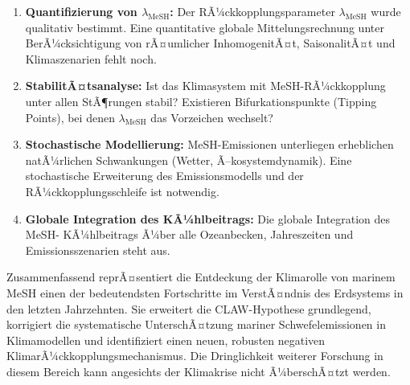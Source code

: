 ﻿\documentclass[a4paper,12pt]{article}
\theoremstyle{definition}
\begin{document}
\begin{enumerate}
  \item \textbf{Quantifizierung von $\lambda_{\mathrm{MeSH}}$:} Der RÃ¼ckkopplungsparameter
        $\lambda_{\mathrm{MeSH}}$ wurde qualitativ bestimmt. Eine quantitative globale
        Mittelungsrechnung unter BerÃ¼cksichtigung von rÃ¤umlicher InhomogenitÃ¤t,
        SaisonalitÃ¤t und Klimaszenarien fehlt noch.
  \item \textbf{StabilitÃ¤tsanalyse:} Ist das Klimasystem mit MeSH-RÃ¼ckkopplung unter allen
        StÃ¶rungen stabil? Existieren Bifurkationspunkte (Tipping Points), bei denen
        $\lambda_{\mathrm{MeSH}}$ das Vorzeichen wechselt?
  \item \textbf{Stochastische Modellierung:} MeSH-Emissionen unterliegen erheblichen natÃ¼rlichen
        Schwankungen (Wetter, Ã–kosystemdynamik). Eine stochastische Erweiterung des
        Emissionsmodells und der RÃ¼ckkopplungsschleife ist notwendig.
  \item \textbf{Globale Integration des KÃ¼hlbeitrags:} Die globale Integration des MeSH-
        KÃ¼hlbeitrags Ã¼ber alle Ozeanbecken, Jahreszeiten und Emissionsszenarien steht aus.
\end{enumerate}

Zusammenfassend reprÃ¤sentiert die Entdeckung der Klimarolle von marinem MeSH einen der
bedeutendsten Fortschritte im VerstÃ¤ndnis des Erdsystems in den letzten Jahrzehnten. Sie
erweitert die CLAW-Hypothese \cite{charlson1987} grundlegend, korrigiert die systematische
UnterschÃ¤tzung mariner Schwefelemissionen in Klimamodellen und identifiziert einen neuen,
robusten negativen KlimarÃ¼ckkopplungsmechanismus. Die Dringlichkeit weiterer Forschung in
diesem Bereich kann angesichts der Klimakrise nicht Ã¼berschÃ¤tzt werden.
\end{document}
